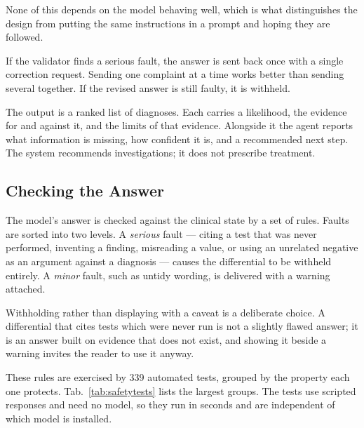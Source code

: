 None of this depends on the model behaving well, which is what distinguishes the design
from putting the same instructions in a prompt and hoping they are followed.

If the validator finds a serious fault, the answer is sent back once with a single
correction request. Sending one complaint at a time works better than sending several
together. If the revised answer is still faulty, it is withheld.

The output is a ranked list of diagnoses. Each carries a likelihood, the evidence for and
against it, and the limits of that evidence. Alongside it the agent reports what
information is missing, how confident it is, and a recommended next step. The system
recommends investigations; it does not prescribe treatment.

\subsection{Checking the Answer}
\label{subsec:reasoning-safety}

The model's answer is checked against the clinical state by a set of rules. Faults are
sorted into two levels. A \emph{serious} fault --- citing a test that was never performed,
inventing a finding, misreading a value, or using an unrelated negative as an argument
against a diagnosis --- causes the differential to be withheld entirely. A \emph{minor}
fault, such as untidy wording, is delivered with a warning attached.

Withholding rather than displaying with a caveat is a deliberate choice. A differential
that cites tests which were never run is not a slightly flawed answer; it is an answer built
on evidence that does not exist, and showing it beside a warning invites the reader to use
it anyway.

These rules are exercised by 339 automated tests, grouped by the property each one
protects. Tab.~\ref{tab:safetytests} lists the largest groups. The tests use scripted
responses and need no model, so they run in seconds and are independent of which model is
installed.

